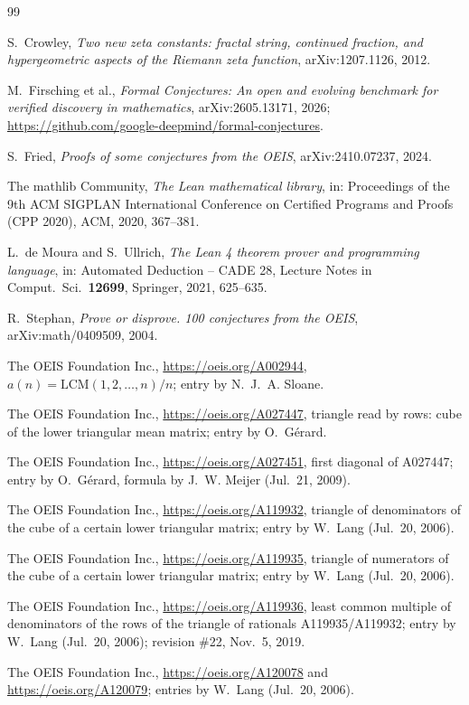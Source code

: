 \documentclass[11pt]{amsart}
\theoremstyle{plain}
\theoremstyle{definition}
\begin{document}
{\small
\begin{thebibliography}{99}

S.~Crowley, \emph{Two new zeta constants: fractal string, continued fraction, and hypergeometric aspects of the Riemann zeta function}, arXiv:1207.1126, 2012.

M.~Firsching et al., \emph{Formal Conjectures: An open and evolving benchmark for verified discovery in mathematics}, arXiv:2605.13171, 2026; \url{https://github.com/google-deepmind/formal-conjectures}.

S.~Fried, \emph{Proofs of some conjectures from the OEIS}, arXiv:2410.07237, 2024.

The mathlib Community, \emph{The Lean mathematical library}, in: Proceedings of the 9th ACM SIGPLAN International Conference on Certified Programs and Proofs (CPP 2020), ACM, 2020, 367--381.

L.~de Moura and S.~Ullrich, \emph{The Lean 4 theorem prover and programming language}, in: Automated Deduction -- CADE 28, Lecture Notes in Comput.\ Sci.\ \textbf{12699}, Springer, 2021, 625--635.

R.~Stephan, \emph{Prove or disprove. 100 conjectures from the OEIS}, arXiv:math/0409509, 2004.

The OEIS Foundation Inc., \url{https://oeis.org/A002944}, $a(n)=\mathrm{LCM}(1,2,\dots,n)/n$; entry by N.~J.~A. Sloane.

The OEIS Foundation Inc., \url{https://oeis.org/A027447}, triangle read by rows: cube of the lower triangular mean matrix; entry by O.~G\'erard.

The OEIS Foundation Inc., \url{https://oeis.org/A027451}, first diagonal of A027447; entry by O.~G\'erard, formula by J.~W. Meijer (Jul.~21, 2009).

The OEIS Foundation Inc., \url{https://oeis.org/A119932}, triangle of denominators of the cube of a certain lower triangular matrix; entry by W.~Lang (Jul.~20, 2006).

The OEIS Foundation Inc., \url{https://oeis.org/A119935}, triangle of numerators of the cube of a certain lower triangular matrix; entry by W.~Lang (Jul.~20, 2006).

The OEIS Foundation Inc., \url{https://oeis.org/A119936}, least common multiple of denominators of the rows of the triangle of rationals A119935/A119932; entry by W.~Lang (Jul.~20, 2006); revision \#22, Nov.~5, 2019.

The OEIS Foundation Inc., \url{https://oeis.org/A120078} and \url{https://oeis.org/A120079}; entries by W.~Lang (Jul.~20, 2006).

\end{thebibliography}
}
\end{document}
